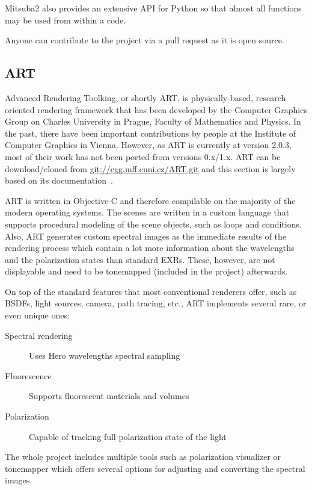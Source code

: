 Mitsuba2 also provides an extensive API for Python so that almost all functions may be used from within a code. 

Anyone can contribute to the project via a pull request as it is open source.

\subsection{ART}

Advanced Rendering Toolking, or shortly ART, is physically-based, research oriented rendering framework that has been developed by the Computer Graphics Group on Charles University in Prague, Faculty of Mathematics and Physics. In the past, there have been important contributions by people at the Institute of Computer Graphics in Vienna. However, as ART is currently at version 2.0.3, most of their work has not been ported from versions 0.x/1.x. ART can be download/cloned from \url{git://cgg.mff.cuni.cz/ART.git} and this section is largely based on its documentation~\cite{artDoc}.

ART is written in Objective-C and therefore compilable on the majority of the modern operating systems. The scenes are written in a custom language that supports procedural modeling of the scene objects, such as loops and conditions. Also, ART generates custom spectral images as the immediate results of the rendering process which contain a lot more information about the wavelengths and the polarization states than standard EXRs. These, however, are not displayable and need to be tonemapped (included in the project) afterwards.

On top of the standard features that most conventional renderers offer, such as BSDFs, light sources, camera, path tracing, etc., ART implements several rare, or even unique ones:

\begin{description}
	\item[Spectral rendering] Uses Hero wavelengths spectral sampling
	\item[Fluorescence] Supports fluorescent materials and volumes
	\item[Polarization] Capable of tracking full polarization state of the light
\end{description}

The whole project includes multiple tools such as polarization visualizer or tonemapper which offers several options for adjusting and converting the spectral images.

